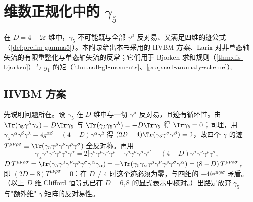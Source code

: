 \chapter{维数正规化中的 $\gamma_5$}\label{app:appI}

在 $D=4-2\varepsilon$ 维中，$\gamma_5$ 不可能既与全部 $\gamma^\mu$ 反对易、又满足四维的迹公式（\cref{def:prelim-gamma5}）。本附录给出本书采用的 HVBM 方案、Larin 对非单态轴矢流的有限重整化与单态轴矢流的反常；它们用于 Bjorken 求和规则（\cref{thm:dis-bjorken}）与 $g_1$ 的矩（\cref{thm:coll-g1-moments}、\cref{prop:coll-anomaly-scheme}）。

\section{HVBM 方案}\label{sec:appI-hvbm}

先说明问题所在。设 $\gamma_5$ 在 $D$ 维中与一切 $\gamma^\mu$ 反对易，且迹有循环性。由 $\Tr(\gamma_5\gamma^\lambda\gamma_\lambda)=D\Tr\gamma_5$ 与 $\Tr(\gamma_\lambda\gamma_5\gamma^\lambda)=-D\Tr\gamma_5$ 得 $\Tr\gamma_5=0$；同理，用 $\gamma_\lambda\gamma^\alpha\gamma^\beta\gamma^\lambda=4g^{\alpha\beta}-(4-D)\gamma^\alpha\gamma^\beta$ 得 $(2D-4)\Tr(\gamma_5\gamma^\alpha\gamma^\beta)=0$，故四个 $\gamma$ 的迹 $T^{\mu\nu\rho\sigma}\equiv\Tr(\gamma_5\gamma^\mu\gamma^\nu\gamma^\rho\gamma^\sigma)$ 全反对称。再用
\[
\gamma_\alpha\gamma^\mu\gamma^\nu\gamma^\rho\gamma^\sigma\gamma^\alpha=2\big[\gamma^\sigma\gamma^\mu\gamma^\nu\gamma^\rho+\gamma^\rho\gamma^\nu\gamma^\mu\gamma^\sigma\big]-(4-D)\gamma^\mu\gamma^\nu\gamma^\rho\gamma^\sigma ,
\]
$D\,T^{\mu\nu\rho\sigma}=\Tr(\gamma_5\gamma^\mu\gamma^\nu\gamma^\rho\gamma^\sigma\gamma^\alpha\gamma_\alpha)=-\Tr(\gamma_5\gamma_\alpha\gamma^\mu\gamma^\nu\gamma^\rho\gamma^\sigma\gamma^\alpha)=(8-D)\,T^{\mu\nu\rho\sigma}$，即 $(2D-8)T^{\mu\nu\rho\sigma}=0$：在 $D\ne4$ 时这个迹必须为零，与四维的 $-4\ii\epsilon^{\mu\nu\rho\sigma}$ 矛盾。（以上 $D$ 维 Clifford 恒等式已在 $D=6,8$ 的显式表示中核对。）出路是放弃 $\gamma_5$ 与"额外维" $\gamma$ 矩阵的反对易性。

